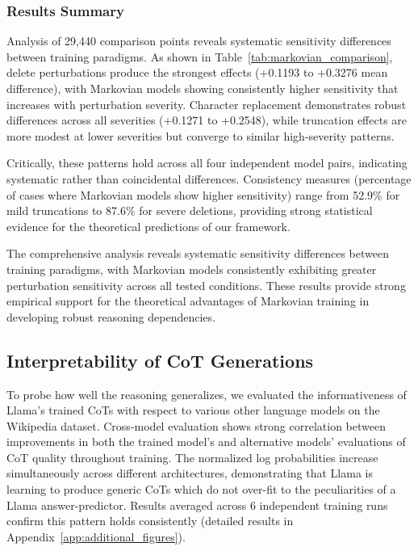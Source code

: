 \documentclass{article} %
\begin{document}
\subsubsection{Results Summary}
Analysis of 29,440 comparison points reveals systematic sensitivity differences between training paradigms. As shown in Table~\ref{tab:markovian_comparison}, delete perturbations produce the strongest effects (+0.1193 to +0.3276 mean difference), with Markovian models showing consistently higher sensitivity that increases with perturbation severity. Character replacement demonstrates robust differences across all severities (+0.1271 to +0.2548), while truncation effects are more modest at lower severities but converge to similar high-severity patterns.

Critically, these patterns hold across all four independent model pairs, indicating systematic rather than coincidental differences. Consistency measures (percentage of cases where Markovian models show higher sensitivity) range from 52.9\% for mild truncations to 87.6\% for severe deletions, providing strong statistical evidence for the theoretical predictions of our framework.

The comprehensive analysis reveals systematic sensitivity differences between training paradigms, with Markovian models consistently exhibiting greater perturbation sensitivity across all tested conditions. These results provide strong empirical support for the theoretical advantages of Markovian training in developing robust reasoning dependencies.

\subsection{Interpretability of CoT Generations}
\label{subsec:interp}

To probe how well the reasoning generalizes, we evaluated the informativeness of Llama's trained CoTs with respect to various other language models on the Wikipedia dataset. Cross-model evaluation shows strong correlation between improvements in both the trained model's and alternative models' evaluations of CoT quality throughout training. The normalized log probabilities increase simultaneously across different architectures, demonstrating that Llama is learning to produce generic CoTs which do not over-fit to the peculiarities of a Llama answer-predictor. Results averaged across 6 independent training runs confirm this pattern holds consistently (detailed results in Appendix~\ref{app:additional_figures}). 
\end{document}
